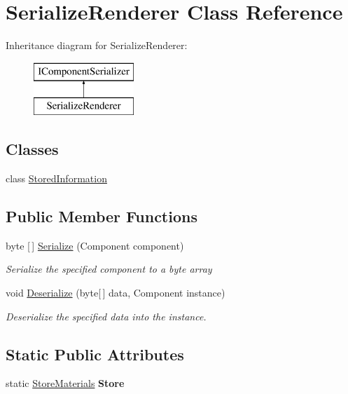 \hypertarget{class_serialize_renderer}{}\section{Serialize\+Renderer Class Reference}
\label{class_serialize_renderer}
Inheritance diagram for Serialize\+Renderer\+:\begin{figure}[H]
\begin{center}
\leavevmode
\includegraphics[height=2.000000cm]{class_serialize_renderer}
\end{center}
\end{figure}
\subsection*{Classes}
\begin{DoxyCompactItemize}
\item 
class \hyperlink{class_serialize_renderer_1_1_stored_information}{Stored\+Information}
\end{DoxyCompactItemize}
\subsection*{Public Member Functions}
\begin{DoxyCompactItemize}
\item 
byte \mbox{[}$\,$\mbox{]} \hyperlink{class_serialize_renderer_afa879a8743291c478d35c50d9956c707}{Serialize} (Component component)
\begin{DoxyCompactList}\small\item\em Serialize the specified component to a byte array \end{DoxyCompactList}\item 
void \hyperlink{class_serialize_renderer_a98dc10a848db6d55165ce92ce5521c39}{Deserialize} (byte\mbox{[}$\,$\mbox{]} data, Component instance)
\begin{DoxyCompactList}\small\item\em Deserialize the specified data into the instance. \end{DoxyCompactList}\end{DoxyCompactItemize}
\subsection*{Static Public Attributes}
\begin{DoxyCompactItemize}
\item 
\mbox{\label{class_serialize_renderer_a764f2c274eae672b01d2c22554053dc1}} 
static \hyperlink{class_store_materials}{Store\+Materials} {\bfseries Store}
\end{DoxyCompactItemize}


